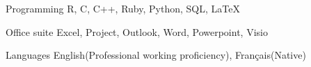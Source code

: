 

\begin{cvskills}

  \cvskill
    {Programming} %
    {R, C, C++, Ruby, Python, SQL, \LaTeX} %

  \cvskill
    {Office suite} %
    {Excel, Project, Outlook, Word, Powerpoint, Visio} %

  \cvskill
    {Languages} %
    {English(Professional working proficiency), Fran\c cais(Native)} %

\end{cvskills}
